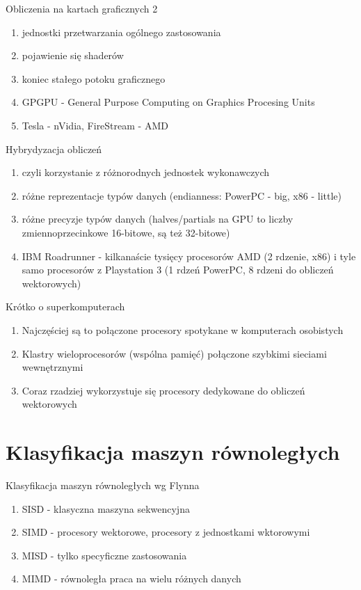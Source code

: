 \documentclass{beamer}
\begin{document}
\begin{frame}{Obliczenia na kartach graficznych 2}
  \begin{enumerate}
  \item jednostki przetwarzania ogólnego zastosowania
  \item pojawienie się shaderów
  \item koniec stałego potoku graficznego
  \item GPGPU - General Purpose Computing on Graphics Procesing Units
  \item Tesla - nVidia, FireStream - AMD
  \end{enumerate}
\end{frame}

\begin{frame}{Hybrydyzacja obliczeń}
  \begin{enumerate}
  \item czyli korzystanie z różnorodnych jednostek wykonawczych
  \item różne reprezentacje typów danych (endianness: PowerPC - big, x86 - little)
  \item różne precyzje typów danych (halves/partials na GPU to liczby zmiennoprzecinkowe 16-bitowe, są też 32-bitowe)
  \item IBM Roadrunner - kilkanaście tysięcy procesorów AMD (2 rdzenie, x86) i tyle samo procesorów z Playstation 3 (1 rdzeń PowerPC, 8 rdzeni do obliczeń wektorowych)
  \end{enumerate}
\end{frame}

\begin{frame}{Krótko o superkomputerach}
  \begin{enumerate}
  \item Najczęściej są to połączone procesory spotykane w komputerach osobistych
  \item Klastry wieloprocesorów (wspólna pamięć) połączone szybkimi sieciami wewnętrznymi
  \item Coraz rzadziej wykorzystuje się procesory dedykowane do obliczeń wektorowych
  \end{enumerate}
\end{frame}

\section{Klasyfikacja maszyn równoległych}

\begin{frame}{Klasyfikacja maszyn równoległych wg Flynna}
  \begin{enumerate}
  \item SISD - klasyczna maszyna sekwencyjna
  \item SIMD - procesory wektorowe, procesory z jednostkami wktorowymi
  \item MISD - tylko specyficzne zastosowania
  \item MIMD - równoległa praca na wielu różnych danych
  \end{enumerate}
\end{frame}
\end{document}
